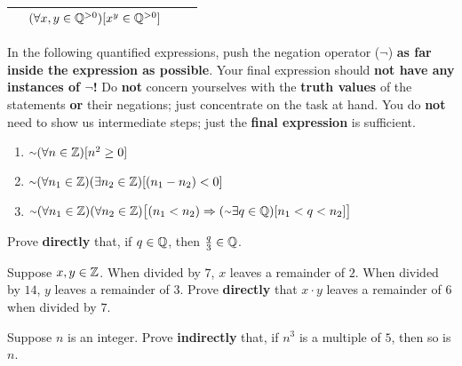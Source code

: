 \documentclass[letterpaper,12pt]{article}
\begin{document}
{\begin{table}[H]
{\begin{tabular}{|c|c|c|c|}
		\currInd & $(\forall x, y \in \mathbb{Q}^{>0})[x^y \in \mathbb{Q}^{>0}]$  & \defcircle &  \\ \hline
	\end{tabular}
	}
	\caption*{}
\end{table} 

\pagebreak



{\large In the following quantified expressions, push the negation operator ($\neg $) {\bf as far inside the expression as possible}. Your final expression should {\bf not have any instances of $\neg $!} Do {\bf not} concern yourselves with the {\bf truth values} of the statements {\bf or} their negations; just concentrate on the task at hand.} You do {\bf not} need to show us intermediate steps; just the {\bf final expression} is sufficient.

\begin{enumerate}[label=(\alph*)] 
	\item  {\Large $\neg  (\forall n \in \Z)[n^2 \geq 0]$ } \answerspace{1in}
	\item {\Large $\neg  (\forall n_1 \in \Z)(\exists n_2 \in \Z)[(n_1 - n_2) < 0]$ } \answerspace{1in}
	\item {\Large $\neg  (\forall n_1 \in \Z)(\forall n_2 \in \Z)\bigl [(n_1 < n_2) \Rightarrow (\nexists q \in \Q)[n_1 < q < n_2] \bigr ]$ } \answerspacefullpage
\end{enumerate}
\pagebreak


  
{\large Prove {\bf directly} that, if  $q \in \mathbb{Q}$, then $\frac{q}{3} \in \mathbb{Q}$}.

\answerspacefullpage


{\large Suppose $x, y \in \mathbb{Z}$. When divided by $7$, $x$ leaves a remainder of $2$. When divided by 
$14$, $y$ leaves a remainder of $3$. Prove {\bf directly} that $x \cdot y$ leaves a remainder of $6$ when divided by $7$. }
\answerspacefullpage



{\large \noindent Suppose $n$ is an integer. Prove {\bf indirectly} that, if $n^3$ is a multiple of $5$, then so is $n$. }

\answerspacefullpage
\additionalanswerspacefullpage

}
\end{document}
